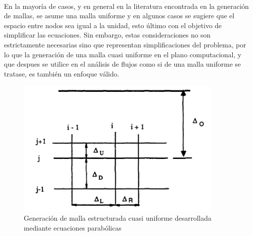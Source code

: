 \documentclass[letterpaper, openright, 12pt]{book}
\begin{document}
    \paragraph*{}
    En la mayoría de casos, y en general en la literatura encontrada en la
    generación de mallas, se asume una malla uniforme y en algunos casos se
    sugiere que el espacio entre nodos sea igual a la unidad, esto último
    con el objetivo de simplificar las ecuaciones. Sin embargo, estas
    consideraciones no son estrictamente necesarias sino que representan
    simplificaciones del problema, por lo que la generación de una malla
    cuasi uniforme en el plano computacional, y que despues se utilice en el
    análisis de flujos como si de una malla uniforme se tratase, es también
    un enfoque válido.
    \begin{figure}[htbp!]
        \centering
        \includegraphics[keepaspectratio, width=100mm]{./img/parabolic_non_uniform.png}
        \caption[Generación de malla cuasi uniforme por ecuaciones
        parabólicas]{Generación de malla estructurada cuasi uniforme
        desarrollada mediante ecuaciones parabólicas \cite{siladicParabolic}}
        \label{fig:parabolic_non_uniform}
    \end{figure}
\end{document}
